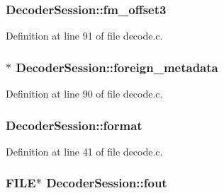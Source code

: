 \subsubsection[{\texorpdfstring{fm\+\_\+offset3}{fm_offset3}}]{ Decoder\+Session\+::fm\+\_\+offset3}\hypertarget{struct_decoder_session_acbaec2e434d569f6b114ae63b9c46399}{}\label{struct_decoder_session_acbaec2e434d569f6b114ae63b9c46399}


Definition at line 91 of file decode.\+c.

\subsubsection[{\texorpdfstring{foreign\+\_\+metadata}{foreign_metadata}}]{$\ast$ Decoder\+Session\+::foreign\+\_\+metadata}\hypertarget{struct_decoder_session_a20a2cb96957df24a1168057dba5a9005}{}\label{struct_decoder_session_a20a2cb96957df24a1168057dba5a9005}


Definition at line 90 of file decode.\+c.

\subsubsection[{\texorpdfstring{format}{format}}]{ Decoder\+Session\+::format}\hypertarget{struct_decoder_session_a518467adf881fa0723062c7830e33310}{}\label{struct_decoder_session_a518467adf881fa0723062c7830e33310}


Definition at line 41 of file decode.\+c.

\subsubsection[{\texorpdfstring{fout}{fout}}]{\setlength{\rightskip}{0pt plus 5cm}F\+I\+LE$\ast$ Decoder\+Session\+::fout}\hypertarget{struct_decoder_session_a2b1860c83fb3259314ad92aa9ce7c3c7}{}\label{struct_decoder_session_a2b1860c83fb3259314ad92aa9ce7c3c7}


